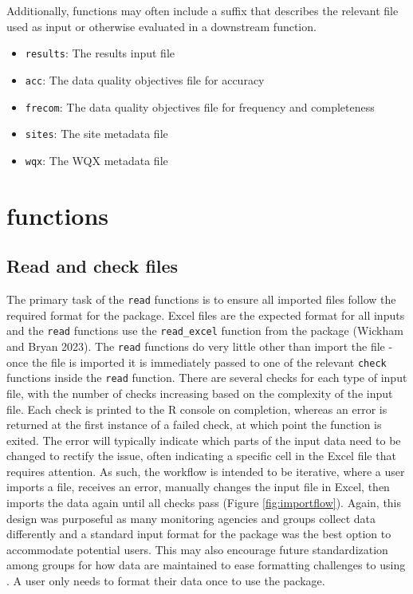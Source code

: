 Additionally, functions may often include a suffix that describes the relevant file used as input or otherwise evaluated in a downstream function.

\begin{itemize}
\tightlist
\item
  \texttt{results}: The results input file
\item
  \texttt{acc}: The data quality objectives file for accuracy
\item
  \texttt{frecom}: The data quality objectives file for frequency and completeness
\item
  \texttt{sites}: The site metadata file
\item
  \texttt{wqx}: The WQX metadata file
\end{itemize}

\hypertarget{functions}{%
\section{\texorpdfstring{ functions}{ functions}}\label{functions}}

\hypertarget{read-and-check-files}{%
\subsection{Read and check files}\label{read-and-check-files}}

The primary task of the \texttt{read} functions is to ensure all imported files follow the required format for the package. Excel files are the expected format for all inputs and the \texttt{read} functions use the \texttt{read\_excel} function from the  package (Wickham and Bryan 2023). The \texttt{read} functions do very little other than import the file - once the file is imported it is immediately passed to one of the relevant \texttt{check} functions inside the \texttt{read} function. There are several checks for each type of input file, with the number of checks increasing based on the complexity of the input file. Each check is printed to the R console on completion, whereas an error is returned at the first instance of a failed check, at which point the function is exited. The error will typically indicate which parts of the input data need to be changed to rectify the issue, often indicating a specific cell in the Excel file that requires attention. As such, the workflow is intended to be iterative, where a user imports a file, receives an error, manually changes the input file in Excel, then imports the data again until all checks pass (Figure \ref{fig:importflow}). Again, this design was purposeful as many monitoring agencies and groups collect data differently and a standard input format for the package was the best option to accommodate potential users. This may also encourage future standardization among groups for how data are maintained to ease formatting challenges to using . A user only needs to format their data once to use the package.

